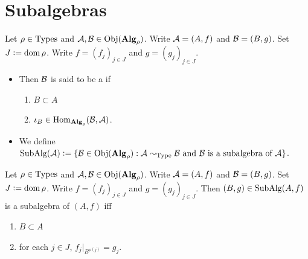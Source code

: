 \documentclass{book}
\begin{document}
	\newpage
	\section{Subalgebras}
	
	\begin{defn}
		Let $\rho \in \operatorname{Types}$ and $\mathcal{A}, \mathcal{B} \in \operatorname{Obj}(\operatorname*{\text{\textbf{Alg}}}_\rho)$. Write $\mathcal{A} = (A, f)$ and $\mathcal{B} = (B, g)$. Set $J \vcentcolon= \operatorname{dom} \rho$. Write $f = (f_j)_{j \in J}$ and $g = (g_j)_{j \in J}$. 
		\begin{itemize}
			\item Then $\mathcal{B}$ is said to be a  if 
			\begin{enumerate}
				\item $B \subset A$ 
				\item $\iota_B \in \operatorname{Hom}_{\operatorname*{\text{\textbf{Alg}}}_\rho}(\mathcal{B}, \mathcal{A})$.
			\end{enumerate}
			\item We define $\operatorname{SubAlg}(\mathcal{A}) \vcentcolon= \{\mathcal{B} \in \operatorname{Obj}(\operatorname*{\text{\textbf{Alg}}}_\rho): \text{$\mathcal{A} \sim_{\operatorname{Type}} \mathcal{B}$ and $\mathcal{B}$ is a subalgebra of $\mathcal{A}$}\}$.
		\end{itemize}
	\end{defn}
	
	\begin{ex}
		Let $\rho \in \operatorname{Types}$ and $\mathcal{A}, \mathcal{B} \in \operatorname{Obj}(\operatorname*{\text{\textbf{Alg}}}_\rho)$. Write $\mathcal{A} = (A, f)$ and $\mathcal{B} = (B, g)$. Set $J \vcentcolon= \operatorname{dom} \rho$. Write $f = (f_j)_{j \in J}$ and $g = (g_j)_{j \in J}$. Then $(B, g) \in \operatorname{SubAlg}(A, f)$ is a subalgebra of $(A, f)$ iff 
		\begin{enumerate}
			\item $B \subset A$ 
			\item for each $j \in J$, $f_j|_{B^{\rho(j)}} = g_j$.
		\end{enumerate}
	\end{ex}
	
\end{document}
